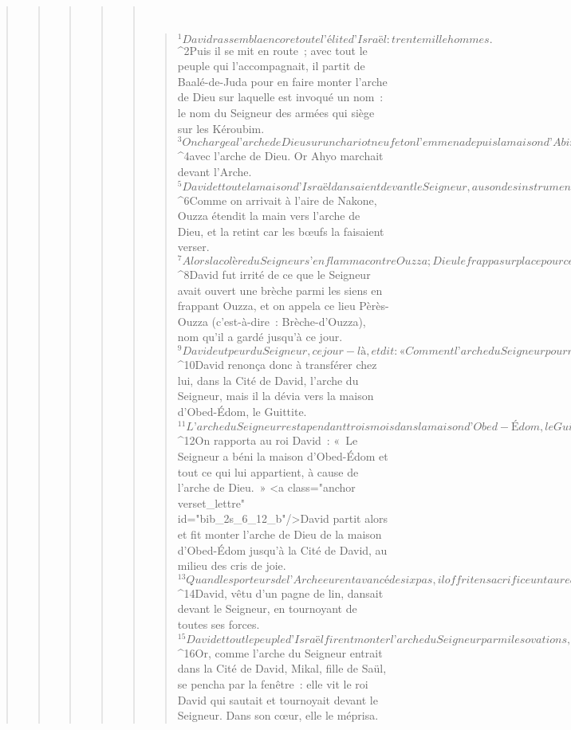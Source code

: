 \begin{verse}
\begin{verse}
\begin{verse}
\begin{verse}
\begin{verse}
         
      \bchapter{}
      \begin{verse}
${}^{1}David rassembla encore toute l’élite d’Israël : trente mille hommes. 
${}^{2}Puis il se mit en route ; avec tout le peuple qui l’accompagnait, il partit de Baalé-de-Juda pour en faire monter l’arche de Dieu sur laquelle est invoqué un nom : le nom du Seigneur des armées qui siège sur les Kéroubim. 
${}^{3}On chargea l’arche de Dieu sur un chariot neuf et on l’emmena depuis la maison d’Abinadab située sur la colline. Ouzza et Ahyo, les fils d’Abinadab, conduisaient le chariot 
${}^{4}avec l’arche de Dieu. Or Ahyo marchait devant l’Arche. 
${}^{5}David et toute la maison d’Israël dansaient devant le Seigneur, au son des instruments en bois de cyprès, cithares et harpes, des tambourins, des sistres et des cymbales. 
${}^{6}Comme on arrivait à l’aire de Nakone, Ouzza étendit la main vers l’arche de Dieu, et la retint car les bœufs la faisaient verser. 
${}^{7}Alors la colère du Seigneur s’enflamma contre Ouzza ; Dieu le frappa sur place pour ce comportement. Ouzza mourut là, près de l’arche de Dieu. 
${}^{8}David fut irrité de ce que le Seigneur avait ouvert une brèche parmi les siens en frappant Ouzza, et on appela ce lieu Pèrès-Ouzza (c’est-à-dire : Brèche-d’Ouzza), nom qu’il a gardé jusqu’à ce jour.
${}^{9}David eut peur du Seigneur, ce jour-là, et dit : « Comment l’arche du Seigneur pourrait-elle entrer chez moi ? » 
${}^{10}David renonça donc à transférer chez lui, dans la Cité de David, l’arche du Seigneur, mais il la dévia vers la maison d’Obed-Édom, le Guittite. 
${}^{11}L’arche du Seigneur resta pendant trois mois dans la maison d’Obed-Édom, le Guittite, et le Seigneur bénit Obed-Édom ainsi que toute sa maison.
${}^{12}On rapporta au roi David : « Le Seigneur a béni la maison d’Obed-Édom et tout ce qui lui appartient, à cause de l’arche de Dieu. » <a class="anchor verset_lettre" id="bib_2s_6_12_b"/>David partit alors et fit monter l’arche de Dieu de la maison d’Obed-Édom jusqu’à la Cité de David, au milieu des cris de joie. 
${}^{13}Quand les porteurs de l’Arche eurent avancé de six pas, il offrit en sacrifice un taureau et un veau gras. 
${}^{14}David, vêtu d’un pagne de lin, dansait devant le Seigneur, en tournoyant de toutes ses forces. 
${}^{15}David et tout le peuple d’Israël firent monter l’arche du Seigneur parmi les ovations, au son du cor. 
${}^{16}Or, comme l’arche du Seigneur entrait dans la Cité de David, Mikal, fille de Saül, se pencha par la fenêtre : elle vit le roi David qui sautait et tournoyait devant le Seigneur. Dans son cœur, elle le méprisa. 

\end{verse}
\end{verse}
\end{verse}
\end{verse}
\end{verse}
\end{verse}
